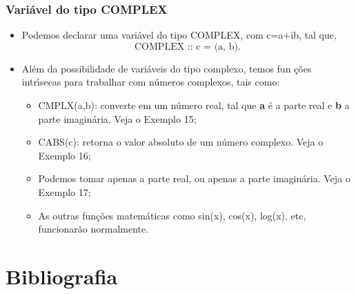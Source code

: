 \documentclass[xcolor=table]{beamer}
\newenvironment{stepitemize}{\begin{itemize}[<+->]}{\end{itemize} }
\begin{document}
\begin{frame}%

\frametitle{Vari\'{a}vel do tipo COMPLEX}

\begin{stepitemize}
\item Podemos declarar uma vari\'{a}vel do tipo COMPLEX, com
c=a+ib\thinspace , tal que,%
\[
\text{COMPLEX :: c = (a, b).} 
\]

\item Al\'{e}m da possibilidade de vari\'{a}veis do tipo complexo, temos fun%
\c{c}\~{o}es intr\'{\i}secas para trabalhar com n\'{u}meros complexos, tais
como:

\begin{itemize}
\item CMPLX(a,b): converte em um n\'{u}mero real, tal que \textbf{a} \'{e} a
parte real e \textbf{b} a parte imagin\'{a}ria. Veja o Exemplo 15;

\item CABS(c): retorna o valor absoluto de um n\'{u}mero complexo. Veja o
Exemplo 16;

\item Podemos tomar apenas a parte real, ou apenas a parte imagin\'{a}ria.
Veja o Exemplo 17;

\item As outras fun\c{c}\~{o}es matem\'{a}ticas como sin(x), cos(x), log(x),
etc, funcionar\~{a}o normalmente.
\end{itemize}
\end{stepitemize}

\transboxout%
\end{frame}%

\section{Bibliografia}
\end{document}
